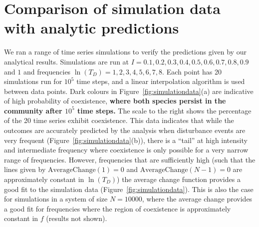 \section{Comparison of simulation data with analytic predictions}
\label{app2d}
We ran a range of time series simulations to verify the predictions given by our analytical results. Simulations are run at $I=0.1,0.2,0.3,0.4,0.5,0.6,0.7,0.8,0.9$ and $1$ and frequencies $\ln(T_D)=1,2,3,4,5,6,7,8$. Each point has 20 simulations run for $10^5$ time steps, and a linear interpolation algorithm is used between data points. Dark colours in Figure~\ref{fig:simulationdata}(a) are indicative of high probability of coexistence, \textbf{where both species persist in the community after $10^5$ time steps.} The scale to the right shows the percentage of the 20 time series exhibit coexistence. This data indicates that while the outcomes are accurately predicted by the analysis when disturbance events are very frequent (Figure~\ref{fig:simulationdata}(b)), there is a ``tail'' at high intensity and intermediate frequency where coexistence is only possible for a very narrow range of frequencies. However, frequencies that are sufficiently high (such that the lines given by $\text{AverageChange}(1)=0$ and $\text{AverageChange}(N-1)=0$  are approximately constant in $\ln(T_D)$) the average change function provides a good fit to the simulation data (Figure~\ref{fig:simulationdata}). This is also the case for simulations in a system of size $N=10000$, where the average change provides a good fit for frequencies where the region of coexistence is approximately constant in $f$ (results not shown).
